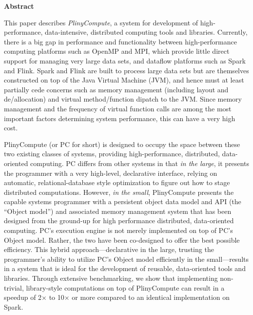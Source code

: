 
\noindent
\textbf{Abstract}

\noindent
This paper describes \emph{PlinyCompute}, a system for development of
high-performance, data-intensive, distributed computing tools and libraries.
Currently, there is a big gap in performance and functionality between 
high-performance computing platforms such as OpenMP and MPI, which provide little direct support for
managing very large data sets, and dataflow platforms such as Spark and Flink.  Spark and Flink
are built to process large data sets but are themselves constructed on top of the
Java Virtual Machine (JVM), and hence must
at least partially cede concerns such as 
memory management (including layout and de/allocation) and virtual method/function dipatch to the JVM. Since memory management 
and the frequency of virtual function calls are
among the most important factors determining system performance,
this can have a very high cost.

PlinyCompute (or PC for short) is designed to occupy the space between these two 
existing classes of systems, providing high-performance, distributed, data-oriented computing.
PC differs from other systems in that \emph{in the large}, it presents the programmer with a very high-level,
declarative interface, relying on automatic, relational-database style optimization to figure out how to stage
distributed computations.  However, \emph{in the small}, PlinyCompute presents the capable systems programmer with a
persistent object data model and API (the ``Object model'') and associated memory management system
that has been designed from the ground-up for
high performance distributed, data-oriented computing.
PC's execution engine is not merely implemented on top of
PC's Object model.  Rather, the two have been co-designed to offer the best possible efficiency.
This hybrid approach---declarative in the large, trusting the programmer's ability
to utilize PC's Object model efficiently
in the small---results in a system that is ideal for the development of reusable, data-oriented tools and libraries.
Through extensive benchmarking, we show that implementing non-trivial, library-style computations 
on top of PlinyCompute can result in a speedup of 2$\times$ to
10$\times$ or more compared to an identical implementation on Spark.
